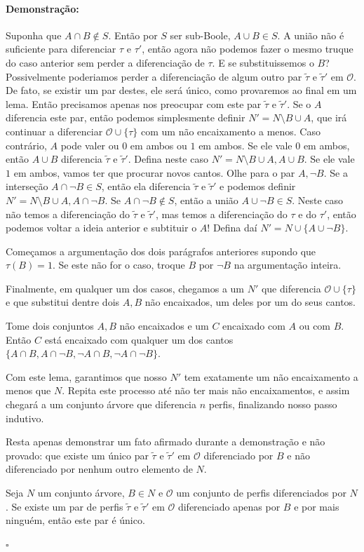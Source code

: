 \documentclass[11pt]{article}
\newcommand{\pulinho}{\vspace{.5cm}}
\theoremstyle{definition}
\theoremstyle{definition}
\theoremstyle{definition}
\theoremstyle{definition}
\theoremstyle{definition}
\theoremstyle{definition}
\theoremstyle{definition}
\theoremstyle{definition}
\theoremstyle{definition}
\theoremstyle{definition}
\theoremstyle{definition}
\theoremstyle{definition}
\newtheorem*{veronica*}{Lema}
\newenvironment{lema*}{
\definecolor{shadecolor}{HTML}{FFF1F2}
\begin{shaded}
\begin{veronica*}
}
{
\end{veronica*}
\end{shaded}
}
\newenvironment{prova}{\paragraph{Demonstração:}}{\hfill$\square$ 
\pulinho
}
\theoremstyle{definition}
\theoremstyle{definition}
\begin{document}
\begin{prova}
Suponha que $A \cap B \notin S$. Então por $S$ ser sub-Boole, $A \cup B \in S$. A união não é suficiente para diferenciar $\tau$ e $\tau'$, então agora não podemos fazer o mesmo truque do caso anterior sem perder a diferenciação de $\tau$. E se substituissemos o $B$? Possivelmente poderiamos perder a diferenciação de algum outro par $\tilde{\tau}$ e $\tilde{\tau}'$ em $\mathcal{O}$. De fato, se existir um par destes, ele será único, como provaremos ao final em um lema. Então precisamos apenas nos preocupar com este par $\tilde{\tau}$ e $\tilde{\tau}'$. Se o $A$ diferencia este par, então podemos simplesmente definir $N' = N \setminus B \cup {A}$, que irá continuar a diferenciar $\mathcal{O} \cup \{\tau\}$ com um não encaixamento a menos. Caso contrário, $A$ pode valer ou $0$ em ambos ou $1$ em ambos. Se ele vale $0$ em ambos, então $A \cup B$ diferencia $\tilde{\tau}$ e $\tilde{\tau}'$. Defina neste caso $N' = N \setminus B \cup {A, A \cup B}$. Se ele vale $1$ em ambos, vamos ter que procurar novos cantos. Olhe para o par $A, \lnot B$. Se a interseção $A \cap \lnot B \in S$, então ela diferencia $\tilde{\tau}$ e $\tilde{\tau}'$ e podemos definir $N' = N \setminus B \cup {A, A \cap \lnot B}$. Se $A \cap \lnot B \notin S$, então a união $A \cup \lnot B \in S$. Neste caso não temos a diferenciação do $\tilde{\tau}$ e $\tilde{\tau}'$, mas temos a diferenciação do $\tau$ e do $\tau'$, então podemos voltar a ideia anterior e subtituir o $A$! Defina daí $N' = N \cup \{A \cup \lnot B\}$.

Começamos a argumentação dos dois parágrafos anteriores supondo que $\tau(B) = 1$. Se este não for o caso, troque $B$ por $\lnot B$ na argumentação inteira. 

Finalmente, em qualquer um dos casos, chegamos a um $N'$ que diferencia $\mathcal{O} \cup \{\tau\}$ e que substitui dentre dois $A,B$ não encaixados, um deles por um do seus cantos.

\begin{lema*}
  Tome dois conjuntos $A,B$ não encaixados e um $C$ encaixado com $A$ ou com $B$. Então $C$ está encaixado com qualquer um dos cantos $\{A \cap B, A \cap \lnot B, \lnot A \cap B, \lnot A \cap \lnot B\}$.
\end{lema*}

Com este lema, garantimos que nosso $N'$ tem exatamente um não encaixamento a menos que $N$. Repita este processo até não ter mais não encaixamentos, e assim chegará a um conjunto árvore que diferencia $n$ perfis, finalizando nosso passo indutivo.

Resta apenas demonstrar um fato afirmado durante a demonstração e não provado: que existe um único par $\tilde{\tau}$ e $\tilde{\tau}'$ em $\mathcal{O}$ diferenciado por $B$ e não diferenciado por nenhum outro elemento de $N$.

\begin{lema*}
  Seja $N$ um conjunto árvore, $B \in N$ e $\mathcal{O}$ um conjunto de perfis diferenciados por $N$. Se existe um par de perfis $\tilde{\tau}$ e $\tilde{\tau}'$ em $\mathcal{O}$ diferenciado apenas por $B$ e por mais ninguém, então este par é único.
\end{lema*}

\end{prova}
\end{document}
